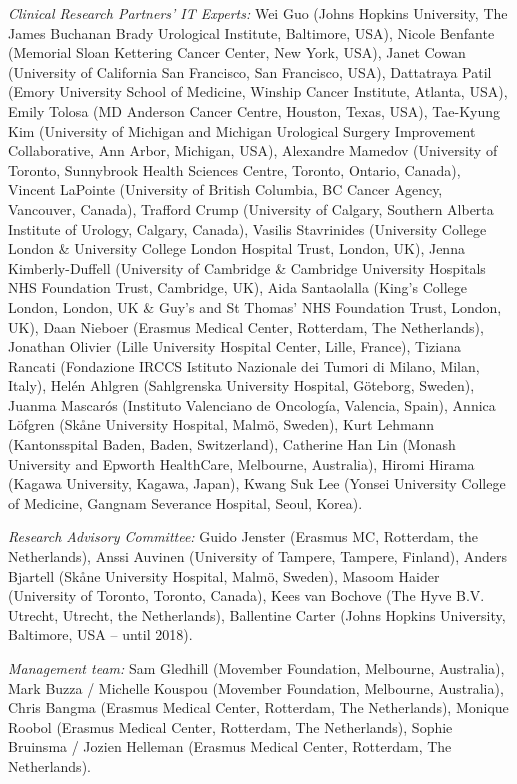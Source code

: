 \textit{Clinical Research Partners’ IT Experts:} Wei Guo (Johns Hopkins University, The James Buchanan Brady Urological Institute, Baltimore, USA), Nicole Benfante (Memorial Sloan Kettering Cancer Center, New York, USA), Janet Cowan (University of California San Francisco, San Francisco, USA), Dattatraya Patil (Emory University School of Medicine, Winship Cancer Institute,  Atlanta, USA), Emily Tolosa (MD Anderson Cancer Centre, Houston, Texas, USA), Tae-Kyung Kim (University of Michigan and Michigan Urological Surgery Improvement Collaborative, Ann Arbor, Michigan, USA), Alexandre Mamedov (University of Toronto, Sunnybrook Health Sciences Centre, Toronto, Ontario, Canada), Vincent LaPointe (University of British Columbia, BC Cancer Agency, Vancouver, Canada), Trafford Crump (University of Calgary, Southern Alberta Institute of Urology, Calgary, Canada), Vasilis Stavrinides (University College London \& University College London Hospital Trust, London, UK), Jenna Kimberly-Duffell (University of Cambridge \& Cambridge University Hospitals NHS Foundation Trust, Cambridge, UK), Aida Santaolalla (King's College London, London, UK \& Guy’s and St Thomas’ NHS Foundation Trust, London, UK), Daan Nieboer (Erasmus Medical Center, Rotterdam, The Netherlands), Jonathan Olivier (Lille University Hospital Center, Lille, France), Tiziana Rancati (Fondazione IRCCS Istituto Nazionale dei Tumori di Milano, Milan, Italy), Helén Ahlgren (Sahlgrenska University Hospital, Göteborg, Sweden), Juanma Mascarós (Instituto Valenciano de Oncología, Valencia, Spain), Annica Löfgren (Skåne University Hospital, Malmö, Sweden), Kurt Lehmann (Kantonsspital Baden, Baden, Switzerland), Catherine Han Lin (Monash University and Epworth HealthCare, Melbourne, Australia), Hiromi Hirama (Kagawa University, Kagawa, Japan), Kwang Suk Lee (Yonsei University College of Medicine, Gangnam Severance Hospital, Seoul, Korea).  

\textit{Research Advisory Committee:} Guido Jenster (Erasmus MC, Rotterdam, the Netherlands), Anssi Auvinen (University of Tampere, Tampere, Finland), Anders Bjartell (Skåne University Hospital, Malmö, Sweden), Masoom Haider (University of Toronto, Toronto, Canada), Kees van Bochove (The Hyve B.V. Utrecht, Utrecht, the Netherlands), Ballentine Carter (Johns Hopkins University, Baltimore, USA – until 2018). 

\textit{Management team:} Sam Gledhill (Movember Foundation, Melbourne, Australia), Mark Buzza / Michelle Kouspou (Movember Foundation, Melbourne, Australia), Chris Bangma (Erasmus Medical Center, Rotterdam, The Netherlands), Monique Roobol (Erasmus Medical Center, Rotterdam, The Netherlands), Sophie Bruinsma / Jozien Helleman (Erasmus Medical Center, Rotterdam, The Netherlands).
